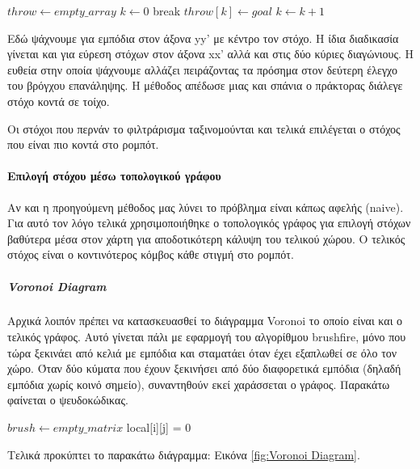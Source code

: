 \begin{algorithmic}	
\State $throw \gets empty\_array$
\State $k \gets 0$
\State break
\EndIf
{}
\State $throw[k]  \gets goal $
\State $k \gets k + 1$
\EndIf		
\EndFor
\EndFor
\end{algorithmic}

Εδώ ψάχνουμε για εμπόδια στον άξονα yy' με κέντρο τον στόχο. Η ίδια διαδικασία γίνεται και για εύρεση στόχων στον άξονα xx' αλλά και στις δύο κύριες διαγώνιους. Η ευθεία στην οποία ψάχνουμε αλλάζει πειράζοντας τα πρόσημα στον δεύτερη έλεγχο του βρόγχου επανάληψης. Η μέθοδος απέδωσε μιας και σπάνια ο πράκτορας διάλεγε στόχο κοντά σε τοίχο. 

Οι στόχοι που περνάν το φιλτράρισμα ταξινομούνται και τελικά επιλέγεται ο στόχος που είναι πιο κοντά στο ρομπότ.

\paragraph{Επιλογή στόχου μέσω τοπολογικού γράφου}

Αν και η προηγούμενη μέθοδος μας λύνει το πρόβλημα είναι κάπως αφελής (naive). Για αυτό τον λόγο τελικά χρησιμοποιήθηκε ο τοπολογικός γράφος για επιλογή στόχων βαθύτερα μέσα στον χάρτη για αποδοτικότερη κάλυψη του τελικού χώρου. Ο τελικός στόχος είναι ο κοντινότερος κόμβος κάθε στιγμή στο ρομπότ.

\subparagraph{Voronoi Diagram}
Αρχικά λοιπόν πρέπει να κατασκευασθεί το διάγραμμα Voronoi το οποίο είναι και ο τελικός γράφος. Αυτό γίνεται πάλι με εφαρμογή του αλγορίθμου brushfire, μόνο που τώρα ξεκινάει από κελιά με εμπόδια και σταματάει όταν έχει εξαπλωθεί σε όλο τον χώρο. Όταν δύο κύματα που έχουν ξεκινήσει από δύο διαφορετικά εμπόδια (δηλαδή εμπόδια χωρίς κοινό σημείο), συναντηθούν εκεί χαράσσεται ο γράφος. 
Παρακάτω φαίνεται ο ψευδοκώδικας. 

\begin{algorithmic}
	\State $brush \gets empty\_matrix$
	\State local[i][j] = 0
	\EndIf
	\EndFor
	\EndFor
\end{algorithmic}

Τελικά προκύπτει το παρακάτω διάγραμμα: Εικόνα \ref{fig:Voronoi Diagram}.
 
